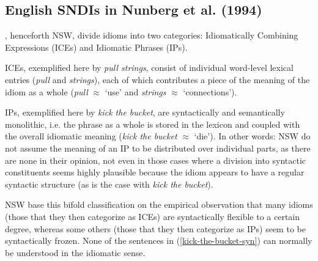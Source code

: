 \documentclass[output=paper]{langsci/langscibook}
\begin{document}
\subsection{English SNDIs in Nunberg et al. (1994)}

\cite{Nunberg1994}, henceforth NSW, divide  idioms into two categories: Idiomatically Combining Expressions (ICEs) and Idiomatic Phrases (IPs).

ICEs, exemplified here by \textit{pull strings}, consist of individual word-level lexical entries (\textit{pull} and \textit{strings}), each of which contributes a piece of the meaning of the idiom as a whole (\textit{pull} $\approx$ `use' and \textit{strings} $\approx$ `connections').

IPs, exemplified here by \textit{kick the bucket}, are syntactically and semantically monolithic, i.e. the phrase as a whole is stored in the lexicon and coupled with the overall idiomatic meaning (\textit{kick the bucket} $\approx$ `die'). In other words: NSW do not assume the meaning of an IP to be distributed over individual parts, as there are none in their opinion, not even in those cases where a division into syntactic constituents seems highly plausible because the idiom appears to have a regular syntactic structure (as is the case with \textit{kick the bucket}).

NSW base this bifold classification on the empirical observation that many  idioms (those that they then categorize as ICEs) are syntactically  flexible to a certain degree, whereas some others (those that they then categorize as IPs) seem to be syntactically frozen. None of the sentences in (\ref{kick-the-bucket-syn}) can normally be understood in the idiomatic sense.

\begin{exe}
\ex\label{kick-the-bucket-syn}
\begin{xlist}
\end{xlist}
\end{exe}
\end{document}
